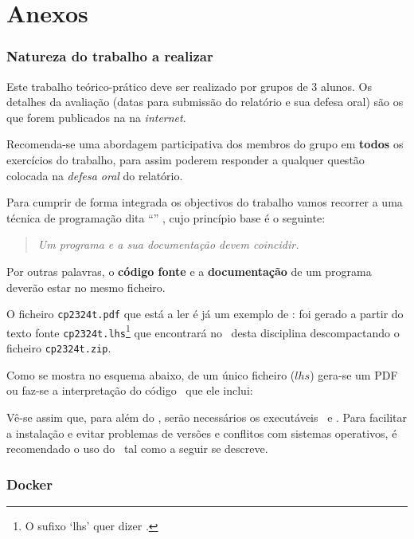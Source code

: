\documentclass[11pt, a4paper, fleqn]{article}
\newcommand{\Varid}[1]{\mathit{#1}}
\begin{document}
\newpage
\part*{Anexos}

\appendix

\section{Natureza do trabalho a realizar}
\label{sec:documentacao}
Este trabalho teórico-prático deve ser realizado por grupos de 3 alunos.
Os detalhes da avaliação (datas para submissão do relatório e sua defesa
oral) são os que forem publicados na  na \emph{internet}.

Recomenda-se uma abordagem participativa dos membros do grupo em \textbf{todos}
os exercícios do trabalho, para assim poderem responder a qualquer questão
colocada na \emph{defesa oral} do relatório.

Para cumprir de forma integrada os objectivos do trabalho vamos recorrer
a uma técnica de programa\-ção dita ``'' \cite{Kn92}, cujo
princípio base é o seguinte:
%
\begin{quote}\em
	Um programa e a sua documentação devem coincidir.
\end{quote}
%
Por outras palavras, o \textbf{código fonte} e a \textbf{documentação} de um
programa deverão estar no mesmo ficheiro.

O ficheiro \texttt{cp2324t.pdf} que está a ler é já um exemplo de
: foi gerado a partir do texto fonte
\texttt{cp2324t.lhs}\footnote{O sufixo `lhs' quer dizer
\emph{}.} que encontrará no \MaterialPedagogico\
desta disciplina des\-com\-pactando o ficheiro \texttt{cp2324t.zip}.

Como se mostra no esquema abaixo, de um único ficheiro (\ensuremath{\Varid{lhs}})
gera-se um PDF ou faz-se a interpretação do código \Haskell\ que ele inclui:

	\esquema

Vê-se assim que, para além do \GHCi, serão necessários os executáveis \PdfLatex\ e
\LhsToTeX. Para facilitar a instalação e evitar problemas de versões e
conflitos com sistemas operativos, é recomendado o uso do \Docker\ tal como
a seguir se descreve.

\section{Docker} \label{sec:docker}
\end{document}
